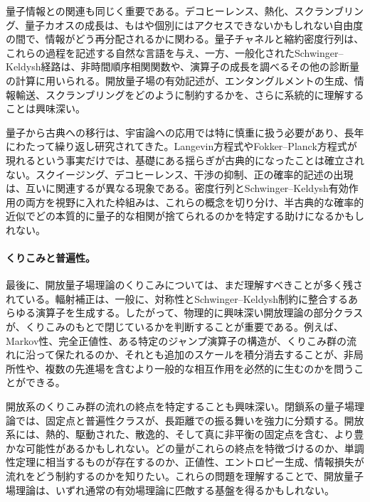 \documentclass[a4paper,11pt,oneside]{article}
\theoremstyle{definition}
\numberwithin{equation}{section}
\begin{document}
量子情報との関連も同じく重要である。デコヒーレンス、熱化、スクランブリング、量子カオスの成長は、もはや個別にはアクセスできないかもしれない自由度の間で、情報がどう再分配されるかに関わる。量子チャネルと縮約密度行列は、これらの過程を記述する自然な言語を与え、一方、一般化されたSchwinger--Keldysh経路は、非時間順序相関関数や、演算子の成長を調べるその他の診断量の計算に用いられる。開放量子場の有効記述が、エンタングルメントの生成、情報輸送、スクランブリングをどのように制約するかを、さらに系統的に理解することは興味深い。



量子から古典への移行は、宇宙論への応用では特に慎重に扱う必要があり、長年にわたって繰り返し研究されてきた。Langevin方程式やFokker--Planck方程式が現れるという事実だけでは、基礎にある揺らぎが古典的になったことは確立されない。スクイージング、デコヒーレンス、干渉の抑制、正の確率的記述の出現は、互いに関連するが異なる現象である。密度行列とSchwinger--Keldysh有効作用の両方を視野に入れた枠組みは、これらの概念を切り分け、半古典的な確率的近似でどの本質的に量子的な相関が捨てられるのかを特定する助けになるかもしれない。



\paragraph{くりこみと普遍性。}



最後に、開放量子場理論のくりこみについては、まだ理解すべきことが多く残されている。輻射補正は、一般に、対称性とSchwinger--Keldysh制約に整合するあらゆる演算子を生成する。したがって、物理的に興味深い開放理論の部分クラスが、くりこみのもとで閉じているかを判断することが重要である。例えば、Markov性、完全正値性、ある特定のジャンプ演算子の構造が、くりこみ群の流れに沿って保たれるのか、それとも追加のスケールを積分消去することが、非局所性や、複数の先進場を含むより一般的な相互作用を必然的に生むのかを問うことができる。



開放系のくりこみ群の流れの終点を特定することも興味深い。閉鎖系の量子場理論では、固定点と普遍性クラスが、長距離での振る舞いを強力に分類する。開放系には、熱的、駆動された、散逸的、そして真に非平衡の固定点を含む、より豊かな可能性があるかもしれない。どの量がこれらの終点を特徴づけるのか、単調性定理に相当するものが存在するのか、正値性、エントロピー生成、情報損失が流れをどう制約するのかを知りたい。これらの問題を理解することで、開放量子場理論は、いずれ通常の有効場理論に匹敵する基盤を得るかもしれない。
\end{document}
